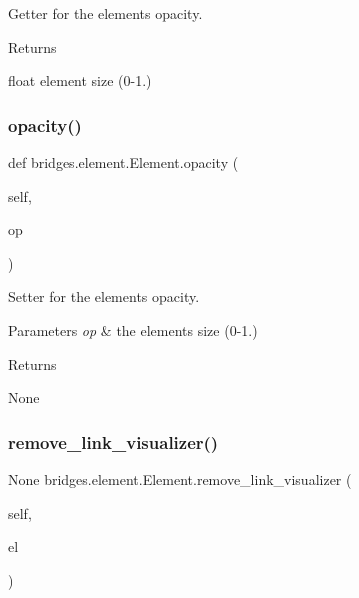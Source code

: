 Getter for the element\textquotesingle{}s opacity. 

\begin{DoxyReturn}{Returns}


float element size (0-\/1.) 
\end{DoxyReturn}
\mbox{\label{classbridges_1_1element_1_1_element_a1542425770b360b39369e3db7116d6ae}} 
\subsubsection{\texorpdfstring{opacity()}{opacity()}\hspace{0.1cm}{\footnotesize\ttfamily [2/2]}}
{\footnotesize\ttfamily def bridges.\+element.\+Element.\+opacity (\begin{DoxyParamCaption}\item[{}]{self,  }\item[{}]{op }\end{DoxyParamCaption})}



Setter for the element\textquotesingle{}s opacity. 


\begin{DoxyParams}{Parameters}
{\em op} & the element\textquotesingle{}s size (0-\/1.) \\
\hline
\end{DoxyParams}
\begin{DoxyReturn}{Returns}


None 
\end{DoxyReturn}
\mbox{\label{classbridges_1_1element_1_1_element_a08a71fea8b2e6bb19eba8ea04d8dae4b}} 
\subsubsection{\texorpdfstring{remove\_link\_visualizer()}{remove\_link\_visualizer()}}
{\footnotesize\ttfamily  None bridges.\+element.\+Element.\+remove\+\_\+link\+\_\+visualizer (\begin{DoxyParamCaption}\item[{}]{self,  }\item[{}]{el }\end{DoxyParamCaption})}



